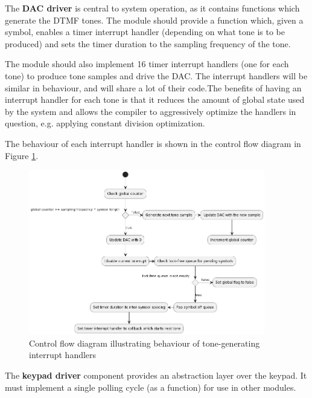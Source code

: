 \documentclass[11pt,a4paper,twocolumn]{scrartcl}
\begin{document}
The \textbf{DAC driver} is central to system operation, as it contains functions which generate the DTMF tones. The module should provide a function which, 
given a symbol, enables a timer interrupt handler (depending on what tone is to be produced) and sets the timer duration to the sampling frequency of the tone.

The module should also implement 16 timer interrupt handlers (one for each tone) to produce tone samples and 
drive the DAC. The interrupt handlers will be similar in behaviour, and will share a lot of their code.The benefits of having an interrupt handler for each tone is that it reduces the amount of global state used by the system and allows the compiler to aggressively optimize the handlers in question, e.g. applying constant division optimization.

The behaviour of each interrupt handler is shown in the control flow diagram in Figure \ref{fig:tone_interrupt_cfd}.

\begin{figure}
   \centering
   \includegraphics[width=0.92\textwidth]{tone_interrupt_cfd}
   \caption{Control flow diagram illustrating behaviour of tone-generating interrupt handlers}
   \label{fig:tone_interrupt_cfd}
\end{figure}

The \textbf{keypad driver} component provides an abstraction layer over the keypad. It must implement a single polling cycle (as a function) for use in other modules.
\end{document}
